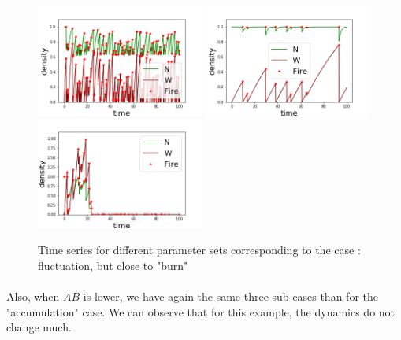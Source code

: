 \documentclass{article}
\begin{document}
\begin{figure}[h!]
\centering
\includegraphics[width=5.5cm]{equivalent_high_1.png}
\includegraphics[width=5.5cm]{equivalent_high_3.png} \\
\includegraphics[width=5.5cm]{equivalent_high_2.png}
\caption{Time series for different parameter sets corresponding to the case : fluctuation, but close to "burn"}
\end{figure}

\newpage
\paragraph{}
Also, when $AB$ is lower, we have again the same three sub-cases than for the "accumulation" case. We can observe that for this example, the dynamics do not change much.%

\end{document}
